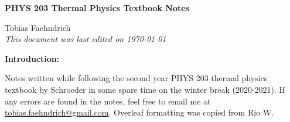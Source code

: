 \documentclass[10pt]{article}
\begin{document}
\begin{tcolorbox}
  \begin{center}
  \begin{Large}
    \textbf{PHYS 203 Thermal Physics Textbook Notes} \\
    \vspace{5pt}
  \end{Large}
  \begin{large}
        Tobias Faehndrich \\
\vspace{5pt}
    \emph{This document was last edited on \today}
  \end{large}
  \end{center}
\end{tcolorbox}

\begin{center}
  \textbf{Introduction:}

Notes written while following the second year PHYS 203 thermal physics textbook by Schroeder in some spare time on the winter break (2020-2021). If any errors are found in the notes, feel free to email me at \href{mailto:tobias.faehndrich@gmail.com}{tobias.faehndrich@gmail.com}. Overleaf formatting was copied from Rio W.

\end{center}
\tableofcontents

\newpage


\newpage


\newpage

\end{document}
